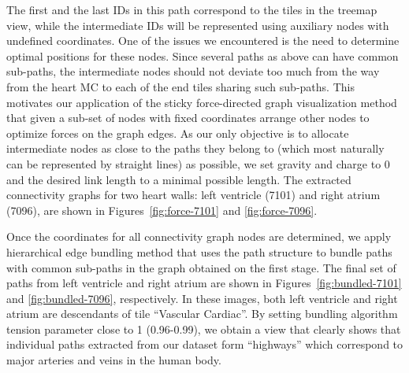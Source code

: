 The first and the last IDs in this path correspond to the tiles in the treemap view, while the intermediate IDs will be represented using auxiliary nodes with undefined coordinates. One of the issues we encountered is the need to determine optimal positions for these nodes. Since several paths as above can have common sub-paths, the intermediate nodes should not deviate too much from the way from the heart MC to each of the end tiles sharing such sub-paths. This motivates our application of the sticky force-directed graph visualization method~\cite{FR91}\cite{Bos14} that given a sub-set of nodes with fixed coordinates arrange other nodes to optimize forces on the graph edges. As our only objective is to allocate intermediate nodes as close to the paths they belong to (which most naturally can be represented by straight lines) as possible, we set gravity and charge to 0 and the desired link length to a minimal possible length. The extracted connectivity graphs for two heart walls: left ventricle (7101) and right atrium (7096), are shown in Figures~\ref{fig:force-7101} and \ref{fig:force-7096}.

Once the coordinates for all connectivity graph nodes are determined, we apply hierarchical edge bundling method that uses the path structure to bundle paths with common sub-paths in the graph obtained on the first stage. The final set of paths from left ventricle and right atrium are shown in Figures~\ref{fig:bundled-7101} and \ref{fig:bundled-7096}, respectively. In these images, both left ventricle and right atrium are descendants of tile ``Vascular Cardiac''. By setting bundling algorithm tension parameter close to 1 (0.96-0.99), we obtain a view that clearly shows that individual paths extracted from our dataset form ``highways'' which correspond to major arteries and veins in the human body.

